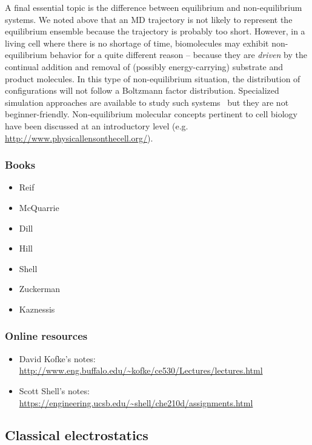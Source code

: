 \documentclass[9pt,bestpractices]{livecoms}
\begin{document}
A final essential topic is the difference between equilibrium and non-equilibrium systems.  
We noted above that an MD trajectory is not likely to represent the equilibrium ensemble because the trajectory is probably too short.  
However, in a living cell where there is no shortage of time, biomolecules may exhibit non-equilibrium behavior for a quite different reason -- because they are \emph{driven} by the continual addition and removal of (possibly energy-carrying) substrate and product molecules.  
In this type of non-equilibrium situation, the distribution of configurations will not follow a Boltzmann factor distribution.  
Specialized simulation approaches are available to study such systems~\cite{Chong:2017:CurrentOpinioninStructuralBiology,  Zuckerman:2017:Annu.Rev.Biophys.} but they are not beginner-friendly.  
Non-equilibrium molecular concepts pertinent to cell biology have been discussed at an introductory level (e.g. \url{http://www.physicallensonthecell.org/}).


\subsubsection{Books}
\begin{itemize}
\item Reif
\item McQuarrie
\item Dill
\item Hill
\item Shell
\item Zuckerman
\item Kaznessis
\end{itemize}


\subsubsection{Online resources}
\begin{itemize}
\item David Kofke's notes: \url{http://www.eng.buffalo.edu/~kofke/ce530/Lectures/lectures.html}
\item Scott Shell's notes: \url{https://engineering.ucsb.edu/~shell/che210d/assignments.html}
\end{itemize}

\subsection{Classical electrostatics}
\label{sec:classical_electrostatics}
\end{document}
